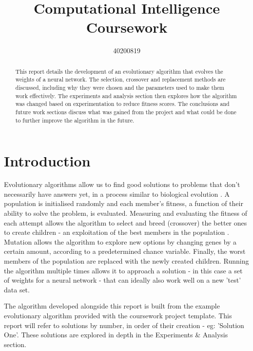 \documentclass[sigconf]{acmart}
\begin{document}
\title{Computational Intelligence Coursework}

\author{40200819}



\begin{abstract}
This report details the development of an evolutionary algorithm that evolves the weights of a neural network. The selection, crossover and replacement methods are discussed, including why they were chosen and the parameters used to make them work effectively. The experiments and analysis section then explores how the algorithm was changed based on experimentation to reduce fitness scores. The conclusions and future work sections discuss what was gained from the project and what could be done to further improve the algorithm in the future.
\end{abstract}





\maketitle

\section{Introduction}
Evolutionary algorithms allow us to find good solutions to problems that don't necessarily have answers yet, in a process similar to biological evolution \cite{evoAlgIntro}. A population is initialised randomly and each member's fitness, a function of their ability to solve the problem, is evaluated. Measuring and evaluating the fitness of each attempt allows the algorithm to select and breed (crossover) the better ones to create children - an exploitation of the best members in the population \cite{exploreExploit}. Mutation allows the algorithm to explore new options by changing genes by a certain amount, according to a predetermined chance variable. Finally, the worst members of the population are replaced with the newly created children. Running the algorithm multiple times allows it to approach a solution - in this case a set of weights for a neural network - that can ideally also work well on a new 'test' data set.

The algorithm developed alongside this report is built from the example evolutionary algorithm provided with the coursework project template. This report will refer to solutions by number, in order of their creation - eg: 'Solution One'. These solutions are explored in depth in the Experiments \& Analysis section.
\end{document}
